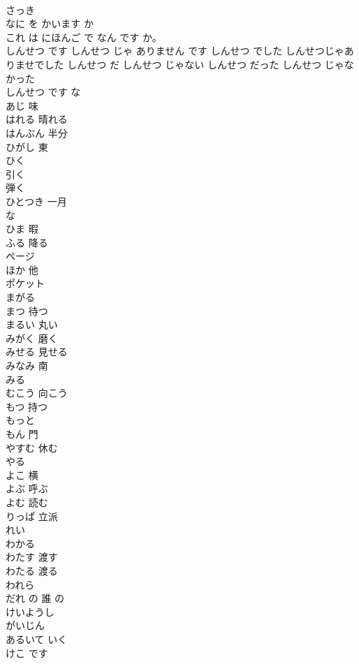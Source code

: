 \documentclass[8pt]{extreport}
\begin{document}
\begin{CJK}{UTF8}{min}
\\	さっき	
\\	なに を かいます か	
\\	これ は にほんご で なん です か。	
\\	しんせつ です しんせつ じゃ ありません です しんせつ でした しんせつじゃありませでした	しんせつ だ しんせつ じゃない しんせつ だった しんせつ じゃなかった	
\\	しんせつ です	な 
\\	あじ	味
\\	はれる	晴れる
\\	はんぶん	半分
\\	ひがし	東
\\	ひく	
\\	引く 
\\	弾く
\\	ひとつき	一月
\\	な 
\\	ひま	暇
\\	ふる	降る
\\	ページ	
\\	ほか	他
\\	ポケット	
\\	まがる	
\\	まつ	待つ
\\	まるい	丸い
\\	みがく	磨く
\\	みせる	見せる
\\	みなみ	南
\\	みる	
\\	むこう	向こう
\\	もつ	持つ
\\	もっと	
\\	もん	門
\\	やすむ	休む
\\	やる	
\\	よこ	横
\\	よぶ	呼ぶ
\\	よむ	読む
\\	りっぱ	立派
\\	れい	
\\	わかる	
\\	わたす	渡す
\\	わたる	渡る
\\	われら	
\\	だれ の	誰 の
\\	けいようし	
\\	がいじん	
\\	あるいて いく	
\\	けこ です	

\end{CJK}
\end{document}
